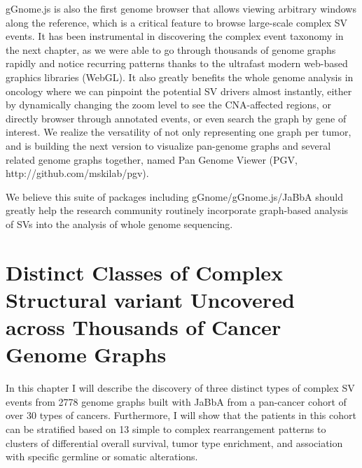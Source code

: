 \documentclass[phd,tocprelim]{cornell}
\begin{document}
gGnome.js is also the first genome browser that allows viewing arbitrary windows along the reference, which is a critical feature to browse large-scale complex SV events. It has been instrumental in discovering the complex event taxonomy in the next chapter, as we were able to go through thousands of genome graphs rapidly and notice recurring patterns thanks to the ultrafast modern web-based graphics libraries (WebGL). It also greatly benefits the whole genome analysis in oncology where we can pinpoint the potential SV drivers almost instantly, either by dynamically changing the zoom level to see the CNA-affected regions, or directly browser through annotated events, or even search the graph by gene of interest. We realize the versatility of not only representing one graph per tumor, and is building the next version to visualize pan-genome graphs and several related genome graphs together, named Pan Genome Viewer (PGV, http://github.com/mskilab/pgv).

We believe this suite of packages including gGnome/gGnome.js/JaBbA should greatly help the research community routinely incorporate graph-based analysis of SVs into the analysis of whole genome sequencing.

\chapter{Distinct Classes of Complex Structural variant Uncovered across Thousands of Cancer Genome Graphs} \label{chap:complex_events}
In this chapter I will describe the discovery of three distinct types of complex SV events from 2778 genome graphs built with JaBbA from a pan-cancer cohort of over 30 types of cancers. Furthermore, I will show that the patients in this cohort can be stratified based on 13 simple to complex rearrangement patterns to clusters of differential overall survival, tumor type enrichment, and association with specific germline or somatic alterations.

\newpage
\end{document}
